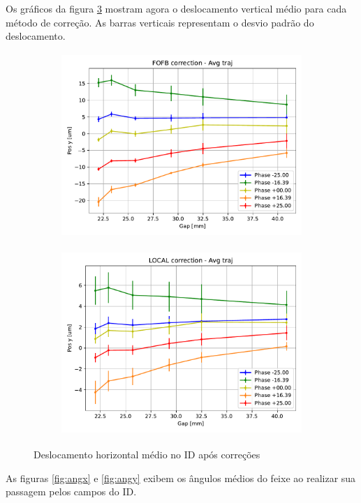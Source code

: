\documentclass[a4paper,12pt]{article}
\begin{document}
Os gráficos da figura \ref{fig:trajy} mostram agora o deslocamento vertical médio para cada método de correção. As barras verticais representam o desvio padrão do deslocamento.

\begin{figure}[H]
\begin{subfigure}{0.5\textwidth}
\includegraphics[width=0.9\linewidth, height=7cm]{figs/FOFB-avg-trajy.pdf} 
\label{fig:subimfofbty}
\end{subfigure}
\begin{subfigure}{0.5\textwidth}
\includegraphics[width=0.9\linewidth, height=7cm]{figs/LOCAL-avg-trajy.pdf}
\label{fig:subimlocalty}
\end{subfigure}
\caption{Deslocamento horizontal médio no ID após correções}
\label{fig:trajy}
\end{figure}

As figuras \ref{fig:angx} e \ref{fig:angy} exibem os ângulos médios do feixe ao realizar sua passagem pelos campos do ID.
\end{document}
